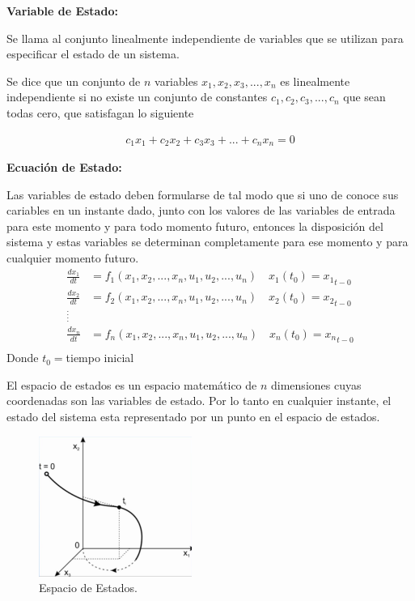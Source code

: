 \documentclass[12pt]{article}
\begin{document}
\vspace{5mm}
\textbf{Variable de Estado:}
\vspace{5mm}

Se llama al conjunto linealmente independiente de variables que se utilizan para especificar el estado de un sistema.

Se dice que un conjunto de $n$ variables $x_{1},x_{2},x_{3},...,x_{n}$ es linealmente independiente si no existe un conjunto de constantes $c_{1},c_{2},c_{3},...,c_{n}$ que sean todas cero, que satisfagan lo siguiente

\begin{equation}
    \begin{split}
        c_{1}x_{1}+c_{2}x_{2}+c_{3}x_{3}+...+c_{n}x_{n}=0
    \end{split}
    \label{eq:lin_indepen}
\end{equation}

\textbf{Ecuación de Estado:}
\vspace{5mm}

Las variables de estado deben formularse de tal modo que si uno de conoce sus cariables en un instante dado, junto con los valores de las variables de entrada para este momento y para todo momento futuro, entonces la disposición del sistema y estas variables se determinan completamente para ese momento y para cualquier momento futuro.
\begin{equation}
    \begin{split}
        \frac{dx_{1}}{dt}&=f_{1}(x_{1},x_{2},...,x_{n},u_{1},u_{2},...,u_{n}) \quad x_{1}(t_{0})={x_{1}}_{t-0}\\
        \frac{dx_{2}}{dt}&=f_{2}(x_{1},x_{2},...,x_{n},u_{1},u_{2},...,u_{n}) \quad x_{2}(t_{0})={x_{2}}_{t-0}\\
        _:^:\\
        \frac{dx_{n}}{dt}&=f_{n}(x_{1},x_{2},...,x_{n},u_{1},u_{2},...,u_{n}) \quad x_{n}(t_{0})={x_{n}}_{t-0}\\
    \end{split}
    \label{eq:state_eq}
\end{equation}
Donde $t_{0}=$tiempo inicial
\vspace{5mm}

El espacio de estados es un espacio matemático de $n$ dimensiones cuyas coordenadas son las variables de estado. Por lo tanto en cualquier instante, el estado del sistema esta representado por un punto en el espacio de estados.
\begin{figure}[h]
    \centering
        \includegraphics[width=5cm]{IMAGENES/estados}
        \caption{Espacio de Estados.}
\end{figure}
\end{document}
